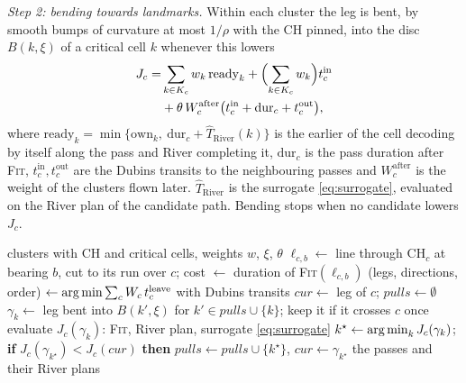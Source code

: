 \emph{Step 2: bending towards landmarks.} Within each cluster the leg is bent, by smooth bumps of curvature at most
$1/\rho$ with the CH pinned, into the disc $B(k,\xi)$ of a critical cell $k$ whenever this lowers
\begin{equation}
\begin{aligned}
J_c=&\sum_{k\in K_c}w_k\,\mathrm{ready}_k+\Bigl(\sum_{k\in K_c}w_k\Bigr)t^{\mathrm{in}}_c\\
&+\theta\,W^{\mathrm{after}}_c\bigl(t^{\mathrm{in}}_c+\mathrm{dur}_c+t^{\mathrm{out}}_c\bigr),
\end{aligned}\label{eq:J}
\end{equation}
where $\mathrm{ready}_k=\min\{\mathrm{own}_k,\ \mathrm{dur}_c+\widehat T_{\mathrm{River}}(k)\}$ is the earlier of the cell
decoding by itself along the pass and River completing it, $\mathrm{dur}_c$ is the pass duration after \textsc{Fit},
$t^{\mathrm{in}}_c,t^{\mathrm{out}}_c$ are the Dubins transits to the neighbouring passes and $W^{\mathrm{after}}_c$ is
the weight of the clusters flown later. $\widehat T_{\mathrm{River}}$ is the surrogate \eqref{eq:surrogate}, evaluated on
the River plan of the candidate path. Bending stops when no candidate lowers $J_c$.

\begin{algorithm}[t]\caption{\lmtour}\label{alg:lmtour}
\begin{algorithmic}[1]\footnotesize
\REQUIRE clusters with CH and critical cells, weights $w$, $\xi$, $\theta$
\STATE $\ell_{c,b}\leftarrow$ line through $\mathrm{CH}_c$ at bearing $b$, cut to its run over $c$; cost
$\leftarrow$ duration of \textsc{Fit}$(\ell_{c,b})$
\ENDFOR
\STATE (legs, directions, order) $\leftarrow\operatorname*{arg\,min}\sum_cW_c\,t^{\mathrm{leave}}_c$ with Dubins transits
\STATE $\mathit{cur}\leftarrow$ leg of $c$; $\mathit{pulls}\leftarrow\emptyset$
\REPEAT
{}
\STATE $\gamma_k\leftarrow$ leg bent into $B(k',\xi)$ for $k'\in\mathit{pulls}\cup\{k\}$; keep it if it crosses $c$ once
\STATE evaluate $J_c(\gamma_k)$: \textsc{Fit}, River plan, surrogate \eqref{eq:surrogate}
\ENDFOR
\STATE $k^\star\leftarrow\operatorname*{arg\,min}_kJ_c(\gamma_k)$; \textbf{if} $J_c(\gamma_{k^\star})<J_c(\mathit{cur})$ \textbf{then}
$\mathit{pulls}\leftarrow\mathit{pulls}\cup\{k^\star\}$, $\mathit{cur}\leftarrow\gamma_{k^\star}$
\ENDFOR
\RETURN the passes and their River plans
\end{algorithmic}
\end{algorithm}

